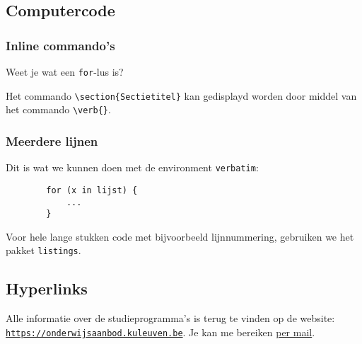 \documentclass{kulakarticle}
\begin{document}
	\subsection{Computercode}
	
	\subsubsection{Inline commando's}
	
	Weet je wat een \texttt{for}-lus is?
	
	Het commando \verb|\section{Sectietitel}| kan gedisplayd worden door middel van het commando \verb|\verb{}|.
	
	\subsubsection{Meerdere lijnen}
	
	Dit is wat we kunnen doen met de environment \texttt{verbatim}:
	
	\begin{verbatim}
		for (x in lijst) {
			...
		}
	\end{verbatim}
	
	Voor hele lange stukken code met bijvoorbeeld lijnnummering, gebruiken we het pakket \texttt{listings}.
	
	\subsection{Hyperlinks}
	
	Alle informatie over de studieprogramma's is terug te vinden op de website: \href{https://onderwijsaanbod.kuleuven.be}{\texttt{https://onderwijsaanbod.kuleuven.be}}. Je kan me bereiken  \href{mailto:vincent.vanschependom@student.kuleuven.be}{per mail}.
	
\end{document}
